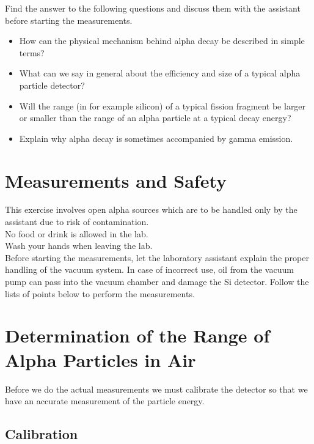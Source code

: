 \documentclass[12pt]{article}
\begin{document}
Find the answer to the following questions and discuss
them with the assistant before starting the measurements.

\begin{itemize}
  
\item How can the physical mechanism behind alpha decay be described
  in simple terms?

\item What can we say in general about the efficiency and size of a typical
alpha particle detector?

\item Will the range (in for example silicon)
of a typical fission fragment be larger or smaller than the
range of an alpha particle at a typical decay energy?

\item Explain why alpha decay is sometimes accompanied by
  gamma emission.

\end{itemize}

\section*{Measurements and Safety}

This exercise involves open alpha sources which are to be handled only by the
assistant due to risk of contamination.\\

\noindent No food or drink is allowed in the lab.\\

\noindent Wash your hands when leaving the lab.\\

\noindent Before starting the measurements, let the laboratory assistant explain
the proper handling of the vacuum system.  In case of incorrect
use, oil from the vacuum pump can pass into the vacuum chamber and damage the
Si detector. Follow the lists of points below to perform the measurements.

\section{Determination of the Range of Alpha Particles in Air}

Before we do the actual measurements we must calibrate the detector so that
we have an accurate measurement of the particle energy.

\subsection{Calibration}
\end{document}
